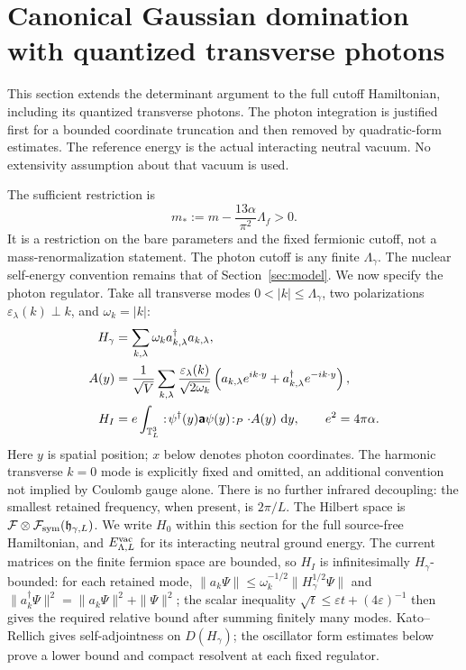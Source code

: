 \section{Canonical Gaussian domination with quantized transverse photons}
\label{pe-section}

This section extends the determinant argument to the full cutoff
Hamiltonian, including its quantized transverse photons. The photon
integration is justified first for a bounded coordinate truncation and
then removed by quadratic-form estimates. The reference energy is the
actual interacting neutral vacuum. No extensivity assumption about that
vacuum is used.

The sufficient restriction is
\begin{equation}
m_*:=m-\frac{13\alpha}{\pi^2}\Lambda_f>0.
\label{pe-mass-condition}
\end{equation}
It is a restriction on the bare parameters and the fixed fermionic
cutoff, not a mass-renormalization statement. The photon cutoff is any
finite \(\Lambda_\gamma\). The nuclear self-energy convention remains
that of Section~\ref{sec:model}. We now specify the photon regulator.
Take all transverse modes \(0<|k|\le\Lambda_\gamma\), two polarizations
\(\varepsilon_\lambda(k)\perp k\), and \(\omega_k=|k|\):
\begin{align}
H_\gamma&=\sum_{k,\lambda}\omega_k a^\dagger_{k,\lambda}a_{k,\lambda},
\\
A(y)&=\frac1{\sqrt V}\sum_{k,\lambda}
\frac{\varepsilon_\lambda(k)}{\sqrt{2\omega_k}}
\left(a_{k,\lambda}e^{ik\cdot y}
+a^\dagger_{k,\lambda}e^{-ik\cdot y}\right),\\
H_I&=e\int_{\mathbb T_L^3}:\!\psi^\dagger(y)\boldsymbol{\mathsf a}
\psi(y)\!:_P\cdot A(y)\,\,\mathrm d y,\qquad e^2=4\pi\alpha .
\label{pe-field-definition}
\end{align}
Here \(y\) is spatial position; \(x\) below denotes photon coordinates.
The harmonic transverse \(k=0\) mode is explicitly fixed and omitted,
an additional convention not implied by Coulomb gauge alone.
There is no further infrared decoupling: the smallest retained
frequency, when present, is \(2\pi/L\). The Hilbert space is
\(\mathcal F\otimes\mathcal F_{\rm sym}(\mathfrak h_{\gamma,L})\).
We write \(H_0\) within this section for the full source-free Hamiltonian,
and \(E^{\mathrm{vac}}_{\Lambda,L}\) for its interacting neutral ground energy.
The current matrices on the finite fermion space are bounded, so
\(H_I\) is infinitesimally \(H_\gamma\)-bounded: for each retained mode,
\(\|a_k\Psi\|\le\omega_k^{-1/2}\|H_\gamma^{1/2}\Psi\|\) and
\(\|a_k^\dagger\Psi\|^2=\|a_k\Psi\|^2+\|\Psi\|^2\);
the scalar inequality \(\sqrt t\le\varepsilon t+(4\varepsilon)^{-1}\)
then gives the required relative bound after summing finitely many modes.
Kato--Rellich gives
self-adjointness on \(D(H_\gamma)\); the oscillator form estimates
below prove a lower bound and compact resolvent at each fixed regulator.

